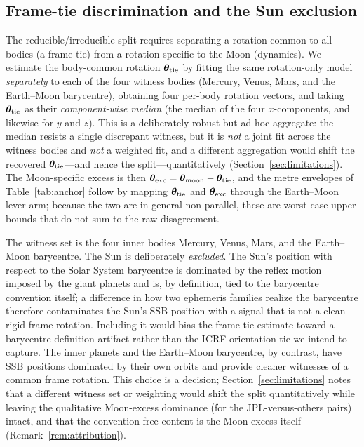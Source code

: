 \subsection{Frame-tie discrimination and the Sun exclusion}
\label{app:frametie}

The reducible/irreducible split requires separating a rotation common to all bodies
(a frame-tie) from a rotation specific to the Moon (dynamics). We estimate the
body-common rotation $\bm{\theta}_{\mathrm{tie}}$ by fitting the same rotation-only model
\emph{separately} to each of the four witness bodies (Mercury, Venus, Mars, and the
Earth--Moon barycentre), obtaining four per-body rotation vectors, and taking
$\bm{\theta}_{\mathrm{tie}}$ as their \emph{component-wise median} (the median of the four
$x$-components, and likewise for $y$ and $z$). This is a deliberately robust but
ad-hoc aggregate: the median resists a single discrepant witness, but it is
\emph{not} a joint fit across the witness bodies and \emph{not} a weighted fit, and a
different aggregation would shift the recovered $\bm{\theta}_{\mathrm{tie}}$---and hence the
split---quantitatively (Section~\ref{sec:limitations}). The Moon-specific excess is
then $\bm{\theta}_{\mathrm{exc}}=\bm{\theta}_{\mathrm{moon}}-\bm{\theta}_{\mathrm{tie}}$, and the metre
envelopes of Table~\ref{tab:anchor} follow by mapping $\bm{\theta}_{\mathrm{tie}}$ and
$\bm{\theta}_{\mathrm{exc}}$ through the Earth--Moon lever arm; because the two are in general
non-parallel, these are worst-case upper bounds that do not sum to the raw
disagreement.

The witness set is the four inner bodies Mercury, Venus, Mars, and the Earth--Moon
barycentre. The Sun is deliberately \emph{excluded}. The Sun's position with respect
to the Solar System barycentre is dominated by the reflex motion imposed by the giant
planets and is, by definition, tied to the barycentre convention itself; a difference
in how two ephemeris families realize the barycentre therefore contaminates the Sun's
SSB position with a signal that is not a clean rigid frame rotation. Including it would
bias the frame-tie estimate toward a barycentre-definition artifact rather than the
ICRF orientation tie we intend to capture. The inner planets and the Earth--Moon
barycentre, by contrast, have SSB positions dominated by their own orbits and provide
cleaner witnesses of a common frame rotation. This choice is a \Modelled{} decision;
Section~\ref{sec:limitations} notes that a different witness set or weighting would
shift the split quantitatively while leaving the qualitative Moon-excess dominance
(for the JPL-versus-others pairs) intact, and that the convention-free content is the
Moon-excess itself (Remark~\ref{rem:attribution}).
